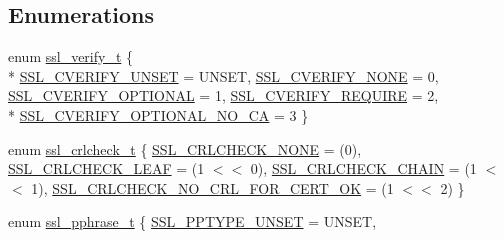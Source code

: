 \subsection*{Enumerations}
\begin{DoxyCompactItemize}
\item 
enum \hyperlink{group__MOD__SSL__PRIVATE_ga5473d623bb868c0030b9d21ff13b04f5}{ssl\+\_\+verify\+\_\+t} \{ \\*
\hyperlink{group__MOD__SSL__PRIVATE_gga5473d623bb868c0030b9d21ff13b04f5a44c340c2751c90ce599075f39b5250b7}{S\+S\+L\+\_\+\+C\+V\+E\+R\+I\+F\+Y\+\_\+\+U\+N\+S\+ET} = U\+N\+S\+ET, 
\hyperlink{group__MOD__SSL__PRIVATE_gga5473d623bb868c0030b9d21ff13b04f5a6242474c37ccdd023fe5916cd18c9d2c}{S\+S\+L\+\_\+\+C\+V\+E\+R\+I\+F\+Y\+\_\+\+N\+O\+NE} = 0, 
\hyperlink{group__MOD__SSL__PRIVATE_gga5473d623bb868c0030b9d21ff13b04f5a1cc08226b890d53cd2011b9b5fcb9d88}{S\+S\+L\+\_\+\+C\+V\+E\+R\+I\+F\+Y\+\_\+\+O\+P\+T\+I\+O\+N\+AL} = 1, 
\hyperlink{group__MOD__SSL__PRIVATE_gga5473d623bb868c0030b9d21ff13b04f5a7dc94ef0b594ecb70742fd3599377b50}{S\+S\+L\+\_\+\+C\+V\+E\+R\+I\+F\+Y\+\_\+\+R\+E\+Q\+U\+I\+RE} = 2, 
\\*
\hyperlink{group__MOD__SSL__PRIVATE_gga5473d623bb868c0030b9d21ff13b04f5a3acf7342e979f10ccde706fe752b3f18}{S\+S\+L\+\_\+\+C\+V\+E\+R\+I\+F\+Y\+\_\+\+O\+P\+T\+I\+O\+N\+A\+L\+\_\+\+N\+O\+\_\+\+CA} = 3
 \}
\item 
enum \hyperlink{group__MOD__SSL__PRIVATE_ga58bfe4388671e2ac78648b9179ee7125}{ssl\+\_\+crlcheck\+\_\+t} \{ \hyperlink{group__MOD__SSL__PRIVATE_gga58bfe4388671e2ac78648b9179ee7125a885bb5afe2a51aebc5b39ce5b6018191}{S\+S\+L\+\_\+\+C\+R\+L\+C\+H\+E\+C\+K\+\_\+\+N\+O\+NE} = (0), 
\hyperlink{group__MOD__SSL__PRIVATE_gga58bfe4388671e2ac78648b9179ee7125a62a44b6acb9e53067a81c251b951a251}{S\+S\+L\+\_\+\+C\+R\+L\+C\+H\+E\+C\+K\+\_\+\+L\+E\+AF} = (1 $<$$<$ 0), 
\hyperlink{group__MOD__SSL__PRIVATE_gga58bfe4388671e2ac78648b9179ee7125af09e54d6a98d3707f3931188f316604f}{S\+S\+L\+\_\+\+C\+R\+L\+C\+H\+E\+C\+K\+\_\+\+C\+H\+A\+IN} = (1 $<$$<$ 1), 
\hyperlink{group__MOD__SSL__PRIVATE_gga58bfe4388671e2ac78648b9179ee7125a5aca9f13854d5d11c78ac5c78b4daf0f}{S\+S\+L\+\_\+\+C\+R\+L\+C\+H\+E\+C\+K\+\_\+\+N\+O\+\_\+\+C\+R\+L\+\_\+\+F\+O\+R\+\_\+\+C\+E\+R\+T\+\_\+\+OK} = (1 $<$$<$ 2)
 \}
\item 
enum \hyperlink{group__MOD__SSL__PRIVATE_gad9be8a03d6bba7c92cf27a00ab9f7971}{ssl\+\_\+pphrase\+\_\+t} \{ \hyperlink{group__MOD__SSL__PRIVATE_ggad9be8a03d6bba7c92cf27a00ab9f7971adcbe9a33942d6e268eb9e9fd412d9b73}{S\+S\+L\+\_\+\+P\+P\+T\+Y\+P\+E\+\_\+\+U\+N\+S\+ET} = U\+N\+S\+ET, 
$$
\end{DoxyCompactItemize}
